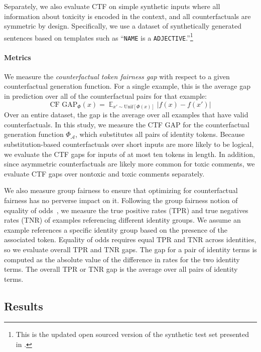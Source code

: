 \documentclass[letterpaper]{article} %
\theoremstyle{definition}
\begin{document}
Separately, we also evaluate CTF on simple synthetic inputs where all information about toxicity is encoded in the context, and all counterfactuals are symmetric by design. Specifically, we use a dataset of synthetically generated sentences based on templates such as ``\texttt{NAME}\xspace is a \texttt{ADJECTIVE}.''\footnote{This is the updated open sourced version of the synthetic test set presented in \cite{Dixon18}.}



\paragraph{Metrics}
We measure the \emph{counterfactual token fairness gap} with respect to a given counterfactual generation function. For a single example, this is the average gap in prediction over all of the counterfactual pairs for that example: 
\[\text{CF GAP}_{\Phi}(x) = {\mathop{\mathbb{E}}_{x' \sim \text{Unif}[\Phi(x)]}|f(x) - f(x')|}\]
Over an entire dataset, the gap is the average over all examples that have valid counterfactuals. In this study, we measure the CTF GAP for the counterfactual generation function $\Phi_{\mathcal{A}}$, which substitutes all pairs of identity tokens.
Because substitution-based counterfactuals over short inputs are more likely to be logical, we evaluate the CTF gaps for inputs of at most ten tokens in length. 
In addition, since asymmetric counterfactuals are likely more common for toxic comments, we evaluate CTF gaps over nontoxic and toxic comments separately. 

We also measure group fairness to ensure that optimizing for counterfactual fairness has no perverse impact on it. Following the group fairness notion of equality of odds~\cite{Hardt16}, we measure the true positive rates (TPR) and true negatives rates (TNR) of examples referencing different identity groups. We assume an example references a specific identity group based on the presence of the associated token. 
Equality of odds requires equal TPR and TNR across identities, so we evaluate overall TPR and TNR gaps. The gap for a pair of identity terms is computed as the absolute value of the difference in rates for the two identity terms. The overall TPR or TNR gap is the average over all pairs of identity terms. 


\subsection{Results}
\end{document}
